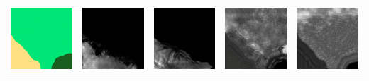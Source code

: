 \documentclass[twocolumn]{article}
\begin{document}
\begin{table}[t]
\begin{tabular}{c|c|c|c|c}
 				\includegraphics[width=0.25\columnwidth]{60.png} & \includegraphics[width=0.25\columnwidth]{61.png} & \includegraphics[width=0.25\columnwidth]{62.png} & \includegraphics[width=0.25\columnwidth]{63.png} & \includegraphics[width=0.25\columnwidth]{64.png} \\

\end{tabular}
\end{table}
\end{document}
